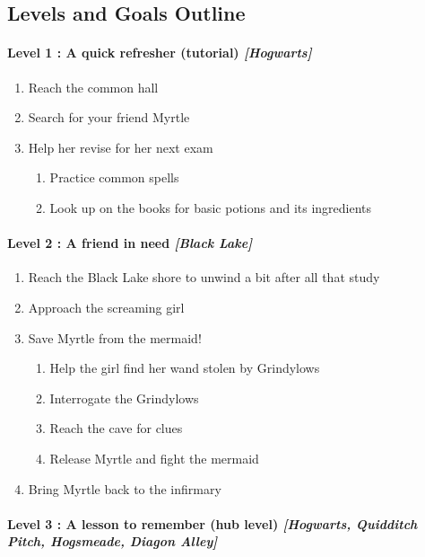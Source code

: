 \pagebreak

\subsection*{Levels and Goals Outline}

\paragraph{Level 1 : A quick refresher (tutorial) \textit{[Hogwarts]}}
\begin{enumerate}[1)]
	\item Reach the common hall
	\item Search for your friend Myrtle
	\item Help her revise for her next exam
	\begin{enumerate}[1.]
		\item Practice common spells
		\item Look up on the books for basic potions and its ingredients
	\end{enumerate}
\end{enumerate}

\paragraph{Level 2 : A friend in need \textit{[Black Lake]}}
\begin{enumerate}[1)]
	\item Reach the Black Lake shore to unwind a bit after all that study
	\item Approach the screaming girl
	\item Save Myrtle from the mermaid!
	\begin{enumerate}[1.]
		\item Help the girl find her wand stolen by Grindylows
		\item Interrogate the Grindylows
		\item Reach the cave for clues
		\item Release Myrtle and fight the mermaid
	\end{enumerate}
	\item Bring Myrtle back to the infirmary
\end{enumerate}

\paragraph{Level 3 : A lesson to remember (hub level) \textit{[Hogwarts, Quidditch Pitch, Hogsmeade, Diagon Alley]}}

